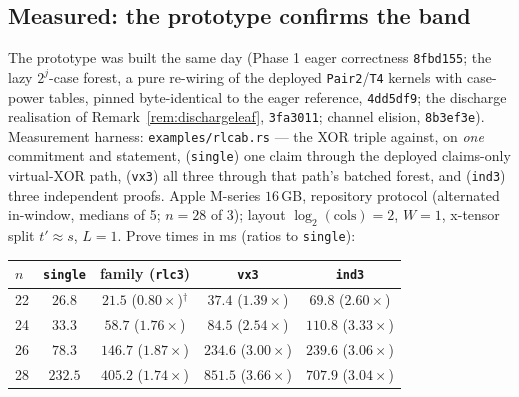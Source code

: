 \documentclass[11pt]{article}
\DeclareRobustCommand{\code}[1]{{\def\_{\textunderscore\allowbreak}\texttt{#1}}}
\theoremstyle{plain}
\theoremstyle{definition}
\theoremstyle{remark}
\begin{document}
\subsection{Measured: the prototype confirms the band}\label{sec:measured}

The prototype was built the same day (Phase 1 eager correctness
\texttt{8fbd155}; the lazy $2^{j}$-case forest, a pure re-wiring of the
deployed \code{Pair2}/\code{T4} kernels with case-power tables, pinned
byte-identical to the eager reference, \texttt{4dd5df9}; the discharge
realisation of Remark~\ref{rem:dischargeleaf}, \texttt{3fa3011}; channel
elision, \texttt{8b3ef3e}). Measurement harness: \code{examples/rlc\_ab.rs}
--- the XOR triple against, on \emph{one} commitment and statement,
(\code{single}) one claim through the deployed claims-only virtual-XOR path,
(\code{vx3}) all three through that path's batched forest, and
(\code{ind3}) three independent proofs. Apple M-series $16$\,GB,
repository protocol (alternated in-window, medians of 5; $n=28$ of 3);
layout $\log_2(\text{cols})=2$, $W=1$, x-tensor split $t'\approx s$, $L=1$.
Prove times in ms (ratios to \code{single}):

\begin{center}\small
\begin{tabular}{@{}lcccc@{}}
\toprule
$n$ & \code{single} & family (\code{rlc3}) & \code{vx3} & \code{ind3}\\
\midrule
22 & $26.8$ & $\mathbf{21.5}$ \;($0.80\times$)$^{\dagger}$ & $37.4$ \;($1.39\times$) & $69.8$ \;($2.60\times$)\\
24 & $33.3$ & $\mathbf{58.7}$ \;($1.76\times$) & $84.5$ \;($2.54\times$) & $110.8$ \;($3.33\times$)\\
26 & $78.3$ & $\mathbf{146.7}$ \;($1.87\times$) & $234.6$ \;($3.00\times$) & $239.6$ \;($3.06\times$)\\
28 & $232.5$ & $\mathbf{405.2}$ \;($1.74\times$) & $851.5$ \;($3.66\times$) & $707.9$ \;($3.04\times$)\\
\bottomrule
\end{tabular}
\end{center}
\end{document}
